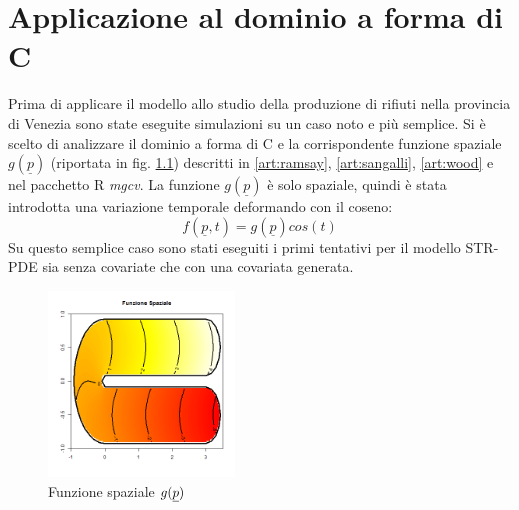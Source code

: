 \documentclass[a4paper,11pt,twoside,openright]{book}							%
\begin{document}
\chapter{Applicazione al dominio a forma di C}
\label{cap:domC}
Prima di applicare il modello allo studio della produzione di rifiuti nella provincia di Venezia sono state eseguite simulazioni su un caso noto e più semplice. Si è scelto di analizzare il dominio a forma di C e la corrispondente funzione spaziale $g(\underline p)$ (riportata in fig. \ref{fig:domC_fstest}) descritti in \ref{art:ramsay}, \ref{art:sangalli}, \ref{art:wood} e nel pacchetto R \textit{mgcv}. La funzione $g(\underline p)$ è solo spaziale, quindi è stata introdotta una variazione temporale deformando con il coseno:
$$
f(\underline p, t)=g(\underline p)cos(t)
$$
Su questo semplice caso sono stati eseguiti i primi tentativi per il modello STR-PDE sia senza covariate che con una covariata generata.
\begin{figure}[h]
	\centering
	\includegraphics[width=0.44\textwidth]{Immagini/DomCinizio/DomC_fstest.png}   
	\caption{Funzione spaziale $g(\protect\underline{p})$}
	\label{fig:domC_fstest}
\end{figure}
\end{document}
